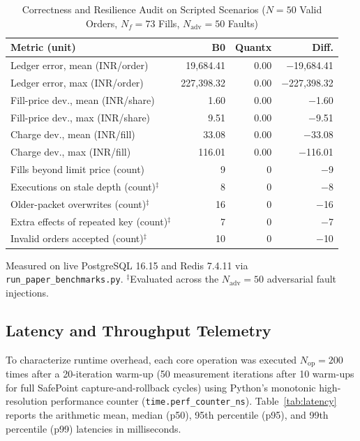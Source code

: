 \documentclass[12pt]{article}
\begin{document}
\begin{table}[!htbp]\begin{singlespace}
\caption{Correctness and Resilience Audit on Scripted Scenarios ($N=50$ Valid Orders, $N_f=73$ Fills, $N_{\mathrm{adv}}=50$ Faults)}
\label{tab:correct}
\centering
\small
\renewcommand{\arraystretch}{1.12}
\begin{tabularx}{\textwidth}{@{}>{\raggedright\arraybackslash}X r r r@{}}
\toprule
Metric (unit) & B0 & Quantx & Diff. \\
\midrule
Ledger error, mean (INR/order) & 19,684.41 & 0.00 & $-$19,684.41 \\
Ledger error, max (INR/order) & 227,398.32 & 0.00 & $-$227,398.32 \\
Fill-price dev., mean (INR/share) & 1.60 & 0.00 & $-$1.60 \\
Fill-price dev., max (INR/share) & 9.51 & 0.00 & $-$9.51 \\
Charge dev., mean (INR/fill) & 33.08 & 0.00 & $-$33.08 \\
Charge dev., max (INR/fill) & 116.01 & 0.00 & $-$116.01 \\
Fills beyond limit price (count) & 9 & 0 & $-$9 \\
Executions on stale depth (count)$^{\ddagger}$ & 8 & 0 & $-$8 \\
Older-packet overwrites (count)$^{\ddagger}$ & 16 & 0 & $-$16 \\
Extra effects of repeated key (count)$^{\ddagger}$ & 7 & 0 & $-$7 \\
Invalid orders accepted (count)$^{\ddagger}$ & 10 & 0 & $-$10 \\
\bottomrule
\end{tabularx}

\vspace{2pt}
{\footnotesize Measured on live PostgreSQL 16.15 and Redis 7.4.11 via \texttt{run\_paper\_benchmarks.py}. $^{\ddagger}$Evaluated across the $N_{\mathrm{adv}}=50$ adversarial fault injections.}
\end{singlespace}\end{table}

\subsection{Latency and Throughput Telemetry}
To characterize runtime overhead, each core operation was executed $N_{\mathrm{op}}=200$ times after a 20-iteration warm-up (50 measurement iterations after 10 warm-ups for full SafePoint capture-and-rollback cycles) using Python's monotonic high-resolution performance counter (\texttt{time.perf\_counter\_ns}). Table~\ref{tab:latency} reports the arithmetic mean, median (p50), 95th percentile (p95), and 99th percentile (p99) latencies in milliseconds.
\end{document}
